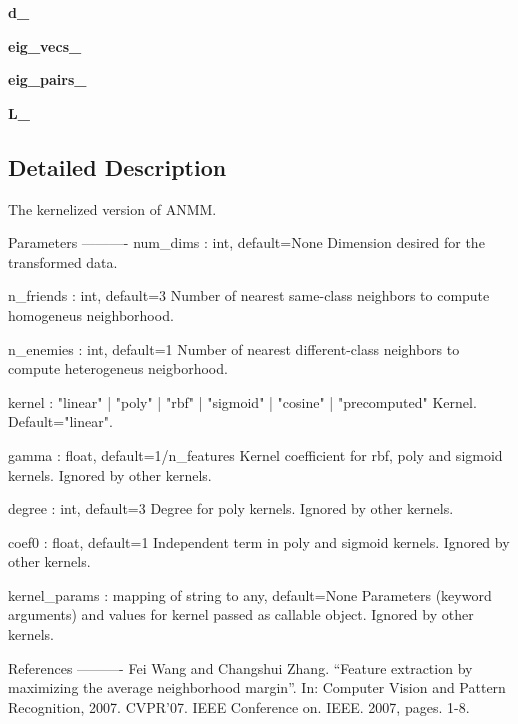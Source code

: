 \begin{DoxyCompactItemize}
\item 
{\bfseries d\+\_\+}\hypertarget{classdml_1_1anmm_1_1KANMM_ad60072d5b0df220ef629878ff8bbf076}{}\label{classdml_1_1anmm_1_1KANMM_ad60072d5b0df220ef629878ff8bbf076}

\item 
{\bfseries eig\+\_\+vecs\+\_\+}\hypertarget{classdml_1_1anmm_1_1KANMM_a15baae5fb44f932523a5705f4313ad24}{}\label{classdml_1_1anmm_1_1KANMM_a15baae5fb44f932523a5705f4313ad24}

\item 
{\bfseries eig\+\_\+pairs\+\_\+}\hypertarget{classdml_1_1anmm_1_1KANMM_aff203f3ca66097f06d7c6bc4140d2cf4}{}\label{classdml_1_1anmm_1_1KANMM_aff203f3ca66097f06d7c6bc4140d2cf4}

\item 
{\bfseries L\+\_\+}\hypertarget{classdml_1_1anmm_1_1KANMM_a4d7e2a756480516b65c31309d70ff3e4}{}\label{classdml_1_1anmm_1_1KANMM_a4d7e2a756480516b65c31309d70ff3e4}

\end{DoxyCompactItemize}


\subsection{Detailed Description}
\begin{DoxyVerb}The kernelized version of ANMM.

Parameters
----------
num_dims : int, default=None
    Dimension desired for the transformed data.

n_friends : int, default=3
    Number of nearest same-class neighbors to compute homogeneus neighborhood.

n_enemies : int, default=1
    Number of nearest different-class neighbors to compute heterogeneus neigborhood.

kernel : "linear" | "poly" | "rbf" | "sigmoid" | "cosine" | "precomputed"
    Kernel. Default="linear".

gamma : float, default=1/n_features
    Kernel coefficient for rbf, poly and sigmoid kernels. Ignored by other
    kernels.

degree : int, default=3
    Degree for poly kernels. Ignored by other kernels.

coef0 : float, default=1
    Independent term in poly and sigmoid kernels.
    Ignored by other kernels.

kernel_params : mapping of string to any, default=None
    Parameters (keyword arguments) and values for kernel passed as
    callable object. Ignored by other kernels.


References
----------
    Fei Wang and Changshui Zhang. “Feature extraction by maximizing the average neighborhood
    margin”. In: Computer Vision and Pattern Recognition, 2007. CVPR’07. IEEE Conference on.
    IEEE. 2007, pages. 1-8.
\end{DoxyVerb}
 

